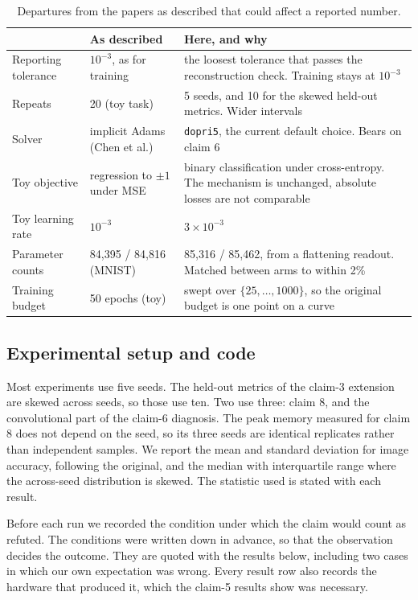 \begin{table}[h]
  \centering
  \small
  \caption{Departures from the papers as described that could affect a reported number.}
  \label{tab:deviations}
  \begin{tabularx}{\linewidth}{@{}lXX@{}}
    \toprule
    & \textbf{As described} & \textbf{Here, and why} \\
    \midrule
    Reporting tolerance & $10^{-3}$, as for training & the loosest tolerance that passes the
      reconstruction check. Training stays at $10^{-3}$ \\
    Repeats & 20 (toy task) & 5 seeds, and 10 for the skewed held-out metrics. Wider
      intervals \\
    Solver & implicit Adams (Chen et al.) & \texttt{dopri5}, the current default choice.
      Bears on claim 6 \\
    Toy objective & regression to $\pm1$ under MSE & binary classification under
      cross-entropy. The mechanism is unchanged, absolute losses are not comparable \\
    Toy learning rate & $10^{-3}$ & $3\times10^{-3}$ \\
    Parameter counts & 84{,}395 / 84{,}816 (MNIST) & 85{,}316 / 85{,}462, from a flattening
      readout. Matched between arms to within 2\% \\
    Training budget & 50 epochs (toy) & swept over $\{25,\dots,1000\}$, so the original
      budget is one point on a curve \\
    \bottomrule
  \end{tabularx}
\end{table}

\subsection{Experimental setup and code}

Most experiments use five seeds. The held-out metrics of the claim-3 extension are skewed
across seeds, so those use ten. Two use three: claim 8, and the convolutional part of the
claim-6 diagnosis. The peak memory measured for claim 8 does not depend on the seed, so its
three seeds are identical replicates rather than independent samples. We report the mean and standard deviation for image accuracy,
following the original, and the median with interquartile range where the across-seed
distribution is skewed. The statistic used is stated with each result.

Before each run we recorded the condition under which the claim would count as refuted. The
conditions were written down in advance, so that the observation decides the outcome. They are
quoted with the results below, including two cases in which our own expectation was wrong.
Every result row also records the hardware that produced it, which the claim-5 results show was necessary.

